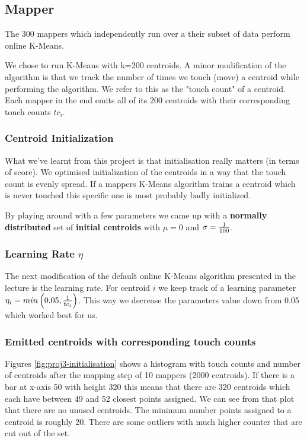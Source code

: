 \documentclass[a4paper, 11pt]{article}
\begin{document}
\subsection{Mapper}
The 300 mappers which independently run over a their subset of data perform online K-Means.

We chose to run K-Means with k=200 centroids. A minor modification of the algorithm is that we track the number of times we touch (move) a centroid while performing the algorithm. We refer to this as the "touch count" of a centroid. Each mapper in the end emits all of its 200 centroids with their corresponding touch counts $tc_i$.

\subsubsection{Centroid Initialization}
What we've learnt from this project is that initialisation really matters (in terms of score). We optimised initialization of the centroids in a way that the touch count is evenly spread. If a mappers K-Means algorithm trains a centroid which is never touched this specific one is most probably badly initialized.

By playing around with a few parameters we came up with a \textbf{normally distributed} set of \textbf{initial centroids} with $\mu = 0$ and $\sigma = {1 \over 100}$.

\subsubsection{Learning Rate $\eta$}
The next modification of the default online K-Means algorithm presented in the lecture is the learning rate. For centroid $i$ we keep track of a learning parameter $\eta_i = min \left(0.05, {1\over tc_i} \right)$. This way we decrease the parameters value down from 0.05 which worked best for us.

\subsubsection{Emitted centroids with corresponding touch counts}
Figures \ref{fig:proj3-initialisation} shows a histogram with touch counts and number of centroids after the mapping step of 10 mappers (2000 centroids). If there is a bar at x-axis 50 with height 320 this means that there are 320 centroids which each have between 49 and 52 closest points assigned. We can see from that plot that there are no unused centroids. The minimum number points assigned to a centroid is roughly 20. There are some outliers with much higher counter that are cut out of the set.
\end{document}
